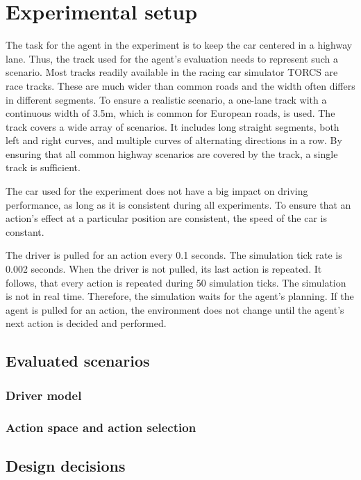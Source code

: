 \chapter{Experimental setup}
\label{sec:setup}


The task for the agent in the experiment is to keep the car centered in a highway lane. Thus, the track used for the agent's evaluation needs to represent such a scenario. Most tracks readily available in the racing car simulator TORCS are race tracks. These are much wider than common roads and the width often differs in different segments. To ensure a realistic scenario, a one-lane track with a continuous width of 3.5m, which is common for European roads, is used. The track covers a wide array of scenarios. It includes long straight segments, both left and right curves, and multiple curves of alternating directions in a row. By ensuring that all common highway scenarios are covered by the track, a single track is sufficient.

The car used for the experiment does not have a big impact on driving performance, as long as it is consistent during all experiments. To ensure that an action's effect at a particular position are consistent, the speed of the car is constant.

The driver is pulled for an action every 0.1 seconds. The simulation tick rate is 0.002 seconds. When the driver is not pulled, its last action is repeated. It follows, that every action is repeated during 50 simulation ticks. The simulation is not in real time. Therefore, the simulation waits for the agent's planning. If the agent is pulled for an action, the environment does not change until the agent's next action is decided and performed.

\section{Evaluated scenarios}
\subsection{Driver model}
\subsection{Action space and action selection}
\section{Design decisions}

